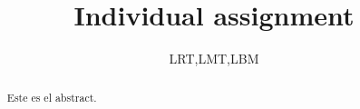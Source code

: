 \documentclass{article}
\begin{document}
\renewcommand{\footrulewidth}{1pt}
\renewcommand{\tablename}{Tabla}
\title{Individual assignment}
\date{LRT,LMT,LBM}%
\maketitle
\begin{abstract}
Este es el abstract.              
\end{abstract}
\end{document}
